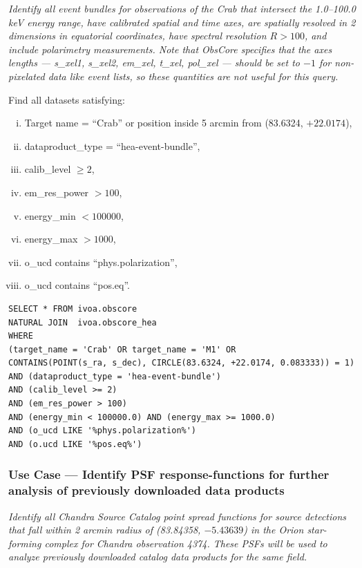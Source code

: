 {\em Identify all event bundles for observations of the Crab that intersect the 1.0--100.0 keV energy range, have calibrated spatial and time axes, are spatially resolved in 2 dimensions in equatorial coordinates, have spectral resolution $R>100$, and include polarimetry measurements.  Note that ObsCore specifies that the axes lengths --- {\em s\_xel1, s\_xel2, em\_xel, t\_xel, pol\_xel} --- should be set to $-1$ for non-pixelated data like event lists, so these quantities are not useful for this query.\/}


\medskip
\noindent Find all datasets satisfying:
\begin{enumerate}[(i)]
  \item Target name = ``Crab'' or position inside 5 arcmin from (83.6324, $+22.0174$),
  \item dataproduct\_type = ``hea-event-bundle'',
  \item calib\_level $\geq 2$,
  \item em\_res\_power $> 100$,
  \item energy\_min $< 100000$,
  \item energy\_max $> 1000$,
  \item o\_ucd contains ``phys.polarization'',
  \item o\_ucd contains ``pos.eq''.
\end{enumerate}

\begin{verbatim}
SELECT * FROM ivoa.obscore
NATURAL JOIN  ivoa.obscore_hea
WHERE
(target_name = 'Crab' OR target_name = 'M1' OR
CONTAINS(POINT(s_ra, s_dec), CIRCLE(83.6324, +22.0174, 0.083333)) = 1)
AND (dataproduct_type = 'hea-event-bundle')
AND (calib_level >= 2)
AND (em_res_power > 100)
AND (energy_min < 100000.0) AND (energy_max >= 1000.0)
AND (o_ucd LIKE '%phys.polarization%')
AND (o.ucd LIKE '%pos.eq%')
\end{verbatim}


\subsubsection{Use Case --- Identify PSF response-functions for further analysis of previously downloaded data products}

{\em Identify all Chandra Source Catalog point spread functions for source detections that fall within 2 arcmin radius of  (83.84358, $-5.43639$) in the Orion star-forming complex for Chandra observation 4374.  These PSFs will be used to analyze previously downloaded catalog data products for the same field.\/ }

